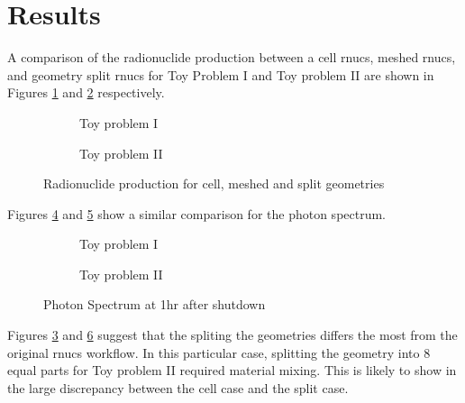\section{Results}

A comparison of the radionuclide production between a cell rnucs, meshed rnucs, and geometry split rnucs  for Toy Problem 
I and Toy problem II are shown 
in Figures \ref{1prod_cell_2x} and \ref{2prod_cell_2x} respectively. \\
\begin{figure}[h]
 \begin{centering}
 \centering
 \begin{subfigure}[b]{.45\textwidth}
 \caption{Toy problem I }
 \label{1prod_cell_2x}
 \end{subfigure}
 \hspace{0.05cm}
 \begin{subfigure}[b]{.45\textwidth}
 \centering
 \caption{Toy problem II}
 \label{2prod_cell_2x}
 \end{subfigure}
 \caption{Radionuclide production for cell, meshed and split geometries}
 \label{prod_cell_2x}
 \end{centering}
\end{figure}

Figures \ref{1spect_cell_2x} and \ref{2spect_cell_2x} show a similar comparison for the photon spectrum.  \\

\begin{figure}[h]
 \begin{centering}
 \centering
 \begin{subfigure}[b]{.45\textwidth}
 \caption{Toy problem I }
 \label{1spect_cell_2x}
 \end{subfigure}
 \hspace{0.05cm}
 \begin{subfigure}[b]{.45\textwidth}
 \centering
 \caption{Toy problem II}
 \label{2spect_cell_2x}
 \end{subfigure}
 \caption{Photon Spectrum at 1hr after shutdown }
 \label{spect_cell_2x}
 \end{centering}
\end{figure}

Figures \ref{prod_cell_2x} and \ref{spect_cell_2x} suggest that the spliting the geometries 
differs the most from the original rnucs workflow. In this particular case, splitting the geometry 
into 8 equal parts for Toy problem II required material mixing. This is likely to show in the large 
discrepancy between the cell case and the split case. 


